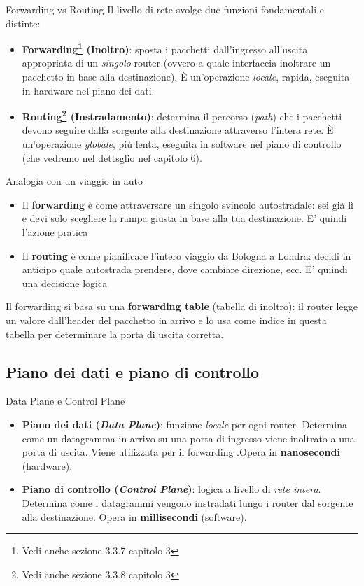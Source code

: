 \documentclass[a4paper,12pt]{report}
\begin{document}
\begin{defbox}{Forwarding vs Routing}
Il livello di rete svolge due funzioni fondamentali e distinte:
\begin{itemize}
    \item \textbf{Forwarding\footnote{Vedi anche  sezione 3.3.7 capitolo 3} (Inoltro)}: sposta i pacchetti dall'ingresso all'uscita appropriata di un \textit{singolo} router (ovvero a quale interfaccia inoltrare un pacchetto in base alla destinazione). È un'operazione \textit{locale}, rapida, eseguita in hardware nel piano dei dati.
    \item \textbf{Routing\footnote{Vedi anche sezione 3.3.8 capitolo 3} (Instradamento)}: determina il percorso (\textit{path}) che i pacchetti devono seguire dalla sorgente alla destinazione attraverso l'intera rete. È un'operazione \textit{globale}, più lenta, eseguita in software nel piano di controllo (che vedremo nel dettsglio nel capitolo 6).
\end{itemize}
\end{defbox}

\begin{esempiobox}{Analogia con un viaggio in auto}
\begin{itemize}
    \item Il \textbf{forwarding} è come attraversare un singolo svincolo autostradale: sei già lì e devi solo scegliere la rampa giusta in base alla tua destinazione. E' quindi l'azione pratica
    \item Il \textbf{routing} è come pianificare l'intero viaggio da Bologna a Londra: decidi in anticipo quale autostrada prendere, dove cambiare direzione, ecc. E' quiindi una decisione logica
\end{itemize}
\end{esempiobox}

Il forwarding si basa su una \textbf{forwarding table} (tabella di inoltro): il router legge un valore dall'header del pacchetto in arrivo e lo usa come indice in questa tabella per determinare la porta di uscita corretta.



\newpage
\subsection{Piano dei dati e piano di controllo }
\label{:piano controllo}
\begin{defbox}{Data Plane e Control Plane}
\begin{itemize}
    \item \textbf{Piano dei dati (\textit{Data Plane})}: funzione \textit{locale} per ogni router. Determina come un datagramma in arrivo su una porta di ingresso viene inoltrato a una porta di uscita. Viene utilizzata per il forwarding .Opera in \textbf{nanosecondi} (hardware).
    \item \textbf{Piano di controllo (\textit{Control Plane})}: logica a livello di \textit{rete intera}. Determina come i datagrammi vengono instradati lungo i router dal sorgente alla destinazione. Opera in \textbf{millisecondi} (software).
\end{itemize}
\end{defbox}
\end{document}
